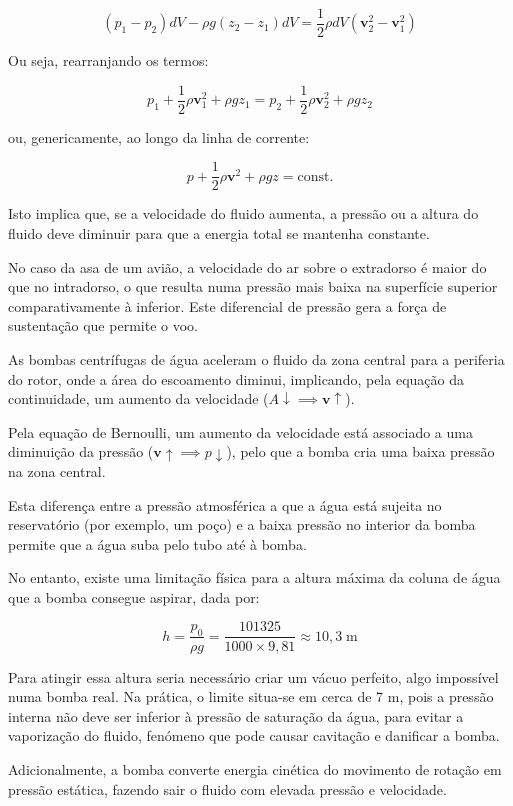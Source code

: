 \begin{equation*}
    (p_1 - p_2) dV - \rho g (z_2 - z_1) dV = \frac{1}{2} \rho dV (\mathbf{v}_2^2 - \mathbf{v}_1^2)
\end{equation*}

Ou seja, rearranjando os termos:

\begin{equation}
    p_1 + \frac{1}{2} \rho \mathbf{v}_1^2 + \rho g z_1 = p_2 + \frac{1}{2} \rho \mathbf{v}_2^2 + \rho g z_2  
\end{equation}    

ou, genericamente, ao longo da linha de corrente:

\begin{equation}
    p + \frac{1}{2} \rho \mathbf{v}^2 + \rho g z = \text{const.}
\end{equation}

Isto implica que, se a velocidade do fluido aumenta, a pressão ou a altura do fluido deve diminuir para que a energia total se mantenha constante.

No caso da asa de um avião, a velocidade do ar sobre o extradorso é maior do que no intradorso, o que resulta numa pressão mais baixa na superfície superior comparativamente à inferior. Este diferencial de pressão gera a força de sustentação que permite o voo.


\begin{examplebox}

As bombas centrífugas de água aceleram o fluido da zona central para a periferia do rotor, onde a área do escoamento diminui, implicando, pela equação da continuidade, um aumento da velocidade (\(A \downarrow \implies \mathbf{v} \uparrow\)). 

Pela equação de Bernoulli, um aumento da velocidade está associado a uma diminuição da pressão (\(\mathbf{v} \uparrow \implies p \downarrow\)), pelo que a bomba cria uma baixa pressão na zona central. 

Esta diferença entre a pressão atmosférica a que a água está sujeita no reservatório (por exemplo, um poço) e a baixa pressão no interior da bomba permite que a água suba pelo tubo até à bomba.

No entanto, existe uma limitação física para a altura máxima da coluna de água que a bomba consegue aspirar, dada por:

\begin{equation*}
    h = \frac{p_0}{\rho g} = \frac{101325}{1000 \times 9,81} \approx 10{,}3 \; \mathrm{m}
\end{equation*}

Para atingir essa altura seria necessário criar um vácuo perfeito, algo impossível numa bomba real. Na prática, o limite situa-se em cerca de 7 m, pois a pressão interna não deve ser inferior à pressão de saturação da água, para evitar a vaporização do fluido, fenómeno que pode causar cavitação e danificar a bomba.

Adicionalmente, a bomba converte energia cinética do movimento de rotação em pressão estática, fazendo sair o fluido com elevada pressão e velocidade.

\end{examplebox}

